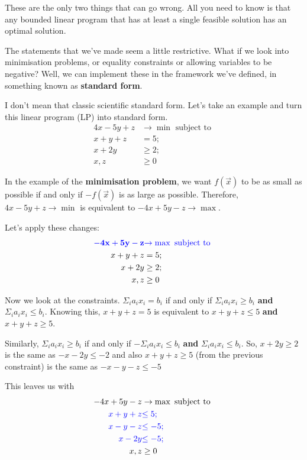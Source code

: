 \documentclass[11pt,a4paper,titlepage,dvipsnames,cmyk]{scrartcl}
\begin{document}
These are the only two things that can go wrong. All you need to know is
that any bounded linear program that has at least a single feasible
solution has an optimal solution.

The statements that we've made seem a little restrictive. What if we look
into minimisation problems, or equality constraints or allowing variables
to be negative? Well, we can implement these in the framework we've
defined, in something known as \textbf{standard form}.

I don't mean that classic scientific standard form. Let's take an example
and turn this linear program (LP) into standard form.
\begin{align*}
    4x - 5y + z &\rightarrow \min \text{ subject to } \\
    x + y + z &= 5; \\
    x + 2y &\ge 2; \\
    x, z &\ge 0
\end{align*}

In the example of the \textbf{minimisation problem}, we want $f(\vec x)$
to be as small as possible if and only if $-f(\vec x)$ is as large as
possible. Therefore, $4x-5y+z \rightarrow \min$ is equivalent to $-4x+5y-z
\rightarrow \max$.

Let's apply these changes:
\begin{align*}
    {\color{blue} \mathbf{-4x+5y-z}} &{\color{blue}\rightarrow \max \text{ subject to }} \\
    x + y + z &= 5; \\
    x + 2y &\ge 2; \\
    x, z &\ge 0
\end{align*}

Now we look at the constraints. $\Sigma_i a_i x_i = b_i$ if and only if
$\Sigma_i a_i x_i \ge b_i$ \textbf{and} $\Sigma_i a_i x_i \le b_i$.
Knowing this, $x + y + z = 5$ is equivalent to $x + y + z \le 5$
\textbf{and} $x + y + z \ge 5$.

 
Similarly, $\Sigma_i a_i x_i \ge b_i$ if and only if
$-\Sigma_i a_i x_i \le b_i$ \textbf{and} $\Sigma_i a_i x_i \le b_i$.
So, $x + 2y \ge 2$ is the same as $- x - 2y \le -2$ and also $x + y + z
\ge 5$ (from the previous constraint) is the same as $-x -y -z \le -5$

This leaves us with
\begin{align*}
    -4x+5y-z &\rightarrow \max \text{ subject to } \\
    {\color{blue}x + y + z} &{\color{blue}\le 5;} \\
    {\color{blue}x - y - z} &{\color{blue}\le -5;} \\
    {\color{blue}x - 2y} &{\color{blue}\le -5;} \\
    x, z &\ge 0
\end{align*}
\end{document}
